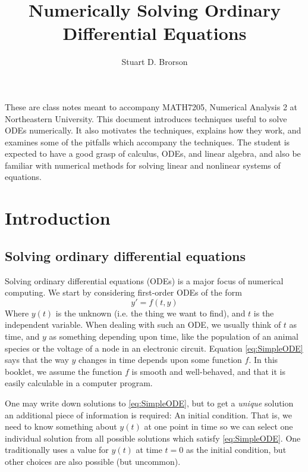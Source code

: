 \documentclass[hidelinks,notitlepage]{book}
\title{Numerically Solving Ordinary Differential Equations}
\author{Stuart D. Brorson}
\affil{Northeastern University}
\begin{document}
\maketitle

These are class notes meant to accompany MATH7205, Numerical Analysis 2 at Northeastern University.   This document introduces techniques useful to solve ODEs numerically.  It also motivates the techniques, explains how they work, and examines some of the pitfalls which accompany the techniques.  The student is expected to have a good grasp of calculus, ODEs, and linear algebra, and also be familiar with numerical methods for solving linear and nonlinear systems of equations.


\newpage

\tableofcontents

\mainmatter
\chapter{Introduction}
\section{Solving ordinary differential equations}
Solving ordinary differential equations (ODEs) is a major focus of numerical computing.  We start by considering first-order ODEs of the form
\begin{equation}
\label{eq:SimpleODE}
y' = f(t, y) 
\end{equation}
Where $y(t)$ is the unknown (i.e. the thing we want to find), and $t$ is the independent variable.  When dealing with such an ODE, we usually think of $t$ as
time, and $y$ as something depending upon time, like the population of an animal species or the voltage of a node in an electronic circuit.  
Equation \cref{eq:SimpleODE} says that the way $y$ changes in time depends upon some function $f$.  
In this booklet, we assume the function $f$ is smooth and well-behaved, and that it is easily calculable in a computer program.

One may write down solutions to \cref{eq:SimpleODE}, but to get a \textit{unique} solution an additional piece of information is required:  An initial condition.  That is, we need to know something about $y(t)$ at one point in time so we can select one individual solution from all possible solutions which satisfy \ref{eq:SimpleODE}.  One traditionally uses a value for $y(t)$ at time $t=0$ as the initial condition, but other choices are also possible (but uncommon). 
\end{document}
